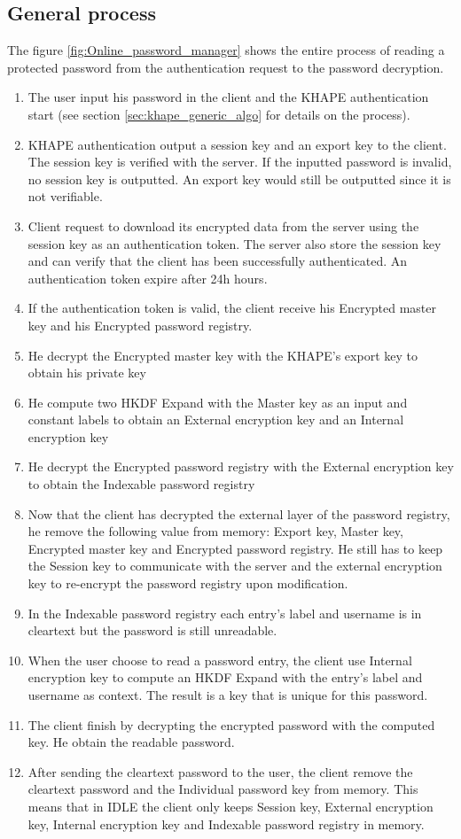 \documentclass[../report.tex]{subfiles}
\begin{document}
\subsection{General process}

The figure \ref{fig:Online_password_manager} shows the entire process of reading a protected password from the authentication request to the password decryption.

\begin{enumerate}
 \item The user input his password in the client and the KHAPE authentication start (see section \ref{sec:khape_generic_algo} for details on the process).
 \item KHAPE authentication output a session key and an export key to the client. The session key is verified with the server. If the inputted password is invalid, no session key is outputted. An export key would still be outputted since it is not verifiable.
 \item Client request to download its encrypted data from the server using the session key as an authentication token. The server also store the session key and can verify that the client has been successfully authenticated. An authentication token expire after 24h hours.
 \item If the authentication token is valid, the client receive his Encrypted master key and his Encrypted password registry.
 \item He decrypt the Encrypted master key with the KHAPE's export key to obtain his private key
 \item He compute two HKDF Expand with the Master key as an input and constant labels to obtain an External encryption key and an Internal encryption key
 \item He decrypt the Encrypted password registry with the External encryption key to obtain the Indexable password registry
 \item Now that the client has decrypted the external layer of the password registry, he remove the following value from memory: Export key, Master key, Encrypted master key and Encrypted password registry. He still has to keep the Session key to communicate with the server and the external encryption key to re-encrypt the password registry upon modification.
 \item In the Indexable password registry each entry's label and username is in cleartext but the password is still unreadable. 
 \item When the user choose to read a password entry, the client use Internal encryption key to compute an HKDF Expand with the entry's label and username as context. The result is a key that is unique for this password.
 \item The client finish by decrypting the encrypted password with the computed key. He obtain the readable password.
 \item After sending the cleartext password to the user, the client remove the cleartext password and the Individual password key from memory. This means that in IDLE the client only keeps Session key, External encryption key, Internal encryption key and Indexable password registry in memory.
\end{enumerate}
\end{document}
